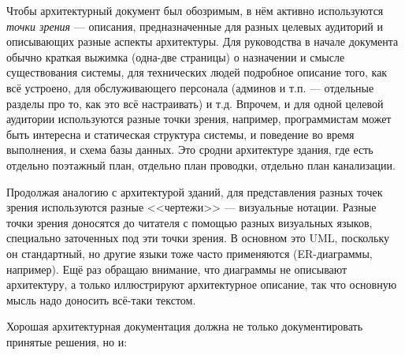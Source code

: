 \documentclass{../mcstext}
\begin{document}
Чтобы архитектурный документ был обозримым, в нём активно используются \emph{точки зрения} --- описания, предназначенные для разных целевых аудиторий и описывающих разные аспекты архитектуры. Для руководства в начале документа обычно краткая выжимка (одна-две страницы) о назначении и смысле существования системы, для технических людей подробное описание того, как всё устроено, для обслуживающего персонала (админов и т.п. --- отдельные разделы про то, как это всё настраивать) и т.д. Впрочем, и для одной целевой аудитории используются разные точки зрения, например, программистам может быть интересна и статическая структура системы, и поведение во время выполнения, и схема базы данных. Это сродни архитектуре здания, где есть отдельно поэтажный план, отдельно план проводки, отдельно план канализации.

Продолжая аналогию с архитектурой зданий, для представления разных точек зрения используются разные <<чертежи>> --- визуальные нотации. Разные точки зрения доносятся до читателя с помощью разных визуальных языков, специально заточенных под эти точки зрения. В основном это UML, поскольку он стандартный, но другие языки тоже часто применяются (ER-диаграммы, например). Ещё раз обращаю внимание, что диаграммы не описывают архитектуру, а только иллюстрируют архитектурное описание, так что основную мысль надо доносить всё-таки текстом.

Хорошая архитектурная документация должна не только документировать принятые решения, но и:
\end{document}
